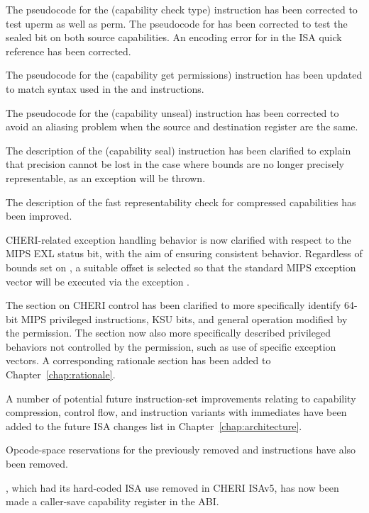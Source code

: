 \begin{description}
  The pseudocode for the  (capability check
  type) instruction has been corrected to test uperm as well as perm.
  The pseudocode for  has been corrected to test the
  sealed bit on both source capabilities.
  An encoding error for  in the ISA quick reference has
  been corrected.

  The pseudocode for the  (capability get permissions)
  instruction has been updated to match syntax used in the
   and  instructions.

  The pseudocode for the  (capability unseal) instruction
  has been corrected to avoid an aliasing problem when the source and
  destination register are the same.

  The description of the  (capability seal) instruction has
  been clarified to explain that precision cannot be lost in the case where
  bounds are no longer precisely representable, as an exception will be thrown.

  The description of the fast representability check for compressed capabilities
  has been improved.

  CHERI-related exception handling behavior is now clarified with respect to the
  MIPS EXL status bit, with the aim of ensuring consistent behavior.
  Regardless of bounds set on \KCC{}, a suitable offset is selected so that the
  standard MIPS exception vector will be executed via the exception \PCC{}.

  The section on CHERI control has been
  clarified to more specifically identify 64-bit MIPS privileged instructions,
  KSU bits, and general operation modified by the \cappermASR
  permission.
  The section now also more specifically described privileged behaviors not
  controlled by the permission, such as use of specific exception vectors.
  A corresponding rationale section has been added to
  Chapter~\ref{chap:rationale}.

  A number of potential future instruction-set improvements relating to
  capability compression, control flow, and instruction variants with immediates
  have been added to the future ISA changes list in
  Chapter~\ref{chap:architecture}.

  Opcode-space reservations for the previously removed 
  and  instructions have also been removed.

  , which had its hard-coded ISA use removed in CHERI ISAv5, has now
  been made a caller-save capability register in the ABI.


\end{description}
